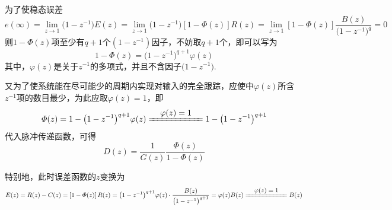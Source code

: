 为了使稳态误差
\begin{equation}
	e(\infty) = \lim\limits_{z\to 1}\big(1-z^{-1}\big)E(z) = \lim\limits_{z\to 1}\big(1-z^{-1}\big)\left[1-\varPhi(z)\right]R(z) = \lim\limits_{z\to 1}\left[1-\varPhi(z)\right]\dfrac{B(z)}{\big(1-z^{-1}\big)^{q}} = 0
\end{equation}
则$1-\varPhi(z)$项至少有$q+1$个$(1-z^{-1})$因子，不妨取$q+1$个，即可以写为
\begin{equation}
	1-\varPhi(z) = \big(1-z^{-1}\big)^{q+1}\varphi(z)
\end{equation}
其中，$\varphi(z)$是关于$z^{-1}$的多项式，并且不含因子$\big(1-z^{-1}\big)$.
\vspace*{0.5em}

又为了使系统能在尽可能少的周期内实现对输入的完全跟踪，应使中$\varphi(z)$所含$z^{-1}$项的数目最少，为此应取$\varphi(z) = 1$，即
\begin{equation}
	\varPhi(z) = 1 - \big(1-z^{-1}\big)^{q+1}\varphi(z) \xlongequal{\textstyle \quad \varphi(z) = 1\quad}  1 - \big(1-z^{-1}\big)^{q+1}
\end{equation}
代入脉冲传递函数，可得
\begin{equation}
	D(z) = \dfrac{1}{G(z)}\dfrac{\varPhi(z)}{1 - \varPhi(z)}
\end{equation}

特别地，此时误差函数的$z$变换为
\begin{equation}
	E(z) = R(z) - C(z) = \left[1 - \varPhi(z)\right]R(z) = \big(1-z^{-1}\big)^{q+1}\varphi(z) \cdot \dfrac{B(z)}{\big(1-z^{-1}\big)^{q+1}} = \varphi(z)B(z)\xlongequal{\textstyle \quad \varphi(z) = 1\quad} B(z)
\end{equation}

